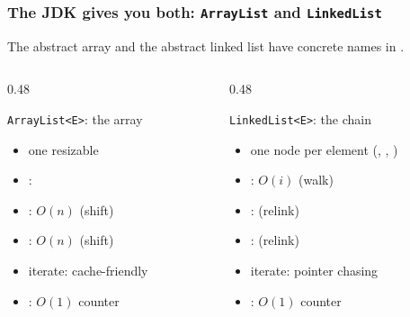 \documentclass[aspectratio=169,10pt,compress]{beamer}
\begin{document}
\begin{frame}[t,fragile] \frametitle{The JDK gives you both: \texttt{ArrayList} and \texttt{LinkedList}}
  \footnotesize
  The abstract array and the abstract linked list have concrete
  names in .

  \begin{columns}[T]
    \begin{column}{0.48\textwidth}
      \begin{block}{\texttt{ArrayList<E>}: the array}
        \scriptsize
        \begin{itemize}\setlength\itemsep{0pt}
          \item one resizable 
          \item {}: 
          \item {}: $O(n)$ (shift)
          \item {}: $O(n)$ (shift)
          \item iterate: cache-friendly
          \item {}: $O(1)$ counter
        \end{itemize}
      \end{block}
    \end{column}
    \begin{column}{0.48\textwidth}
      \begin{block}{\texttt{LinkedList<E>}: the chain}
        \scriptsize
        \begin{itemize}\setlength\itemsep{0pt}
          \item one node per element
                (, , )
          \item {}: $O(i)$ (walk)
          \item {}:  (relink)
          \item {}:  (relink)
          \item iterate: pointer chasing
          \item {}: $O(1)$ counter
        \end{itemize}
      \end{block}
    \end{column}
  \end{columns}
  \vspace{0.2em}
  \begin{center}\scriptsize

\end{center}
\end{frame}
\end{document}
